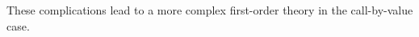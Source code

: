 These complications lead to a more complex first-order theory in the call-by-value 
case.















